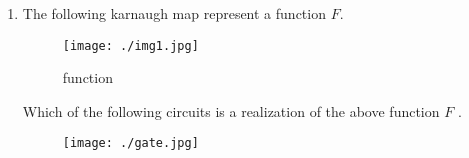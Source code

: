 \documentclass[12pt,-letter paper]{article}
\begin{document}
\begin{enumerate}
\item The following karnaugh map represent     a function $F$.
	\begin{figure}[!ht]
\texttt{[image: ./img1.jpg]}
\label{fig:fig1.0}
\caption{function}
\end{figure}
\newpage
Which of the following circuits is a realization of the above function $F$ .
\begin{figure}[!ht]
\texttt{[image: ./gate.jpg]}
\end{figure}
\end{enumerate}
\end{document}
